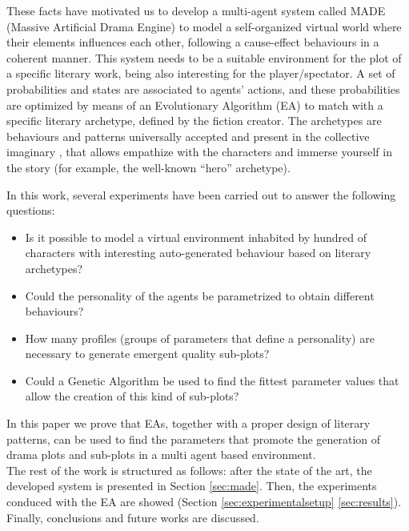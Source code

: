 \documentclass[runningheads]{llncs}
\begin{document}
These facts have motivated us to develop a multi-agent system called MADE (Massive Artificial Drama Engine) to model a self-organized virtual world where their elements influences each other, following a cause-effect behaviours in a coherent manner. This system needs to be a suitable environment for the plot of a specific literary work, being also interesting for the player/spectator. A set of probabilities and states are associated to agents' actions, and these probabilities are optimized by means of an Evolutionary Algorithm (EA) to match with a specific literary archetype, defined by the fiction creator. The archetypes are behaviours and patterns universally accepted and present in the collective imaginary \cite{ArchetypesGarry05}, that allows empathize with the characters and immerse yourself in the story (for example, the well-known ``hero'' archetype).

In this work, several experiments have been carried out to answer the following questions: 

\begin{itemize}
 \item Is it possible to model a virtual environment inhabited by hundred of characters with interesting auto-generated behaviour based on literary archetypes?
 \item Could the personality of the agents be parametrized to obtain different behaviours? 
 \item How many profiles (groups of parameters that define a personality) are necessary to generate emergent quality sub-plots?
 \item Could a Genetic Algorithm be used to find the fittest parameter values that allow the creation of this kind of sub-plots?
\end{itemize}

In this paper we prove that EAs, together with a proper design of literary patterns, can be used to find the parameters that promote the generation of drama plots and sub-plots in a multi agent based environment.\\

The rest of the work is structured as follows: after the state of the art, the developed system is presented in Section \ref{sec:made}. Then, the experiments conduced with the EA are showed (Section \ref{sec:experimentalsetup} \ref{sec:results}). Finally, conclusions and future works are discussed.

\end{document}

